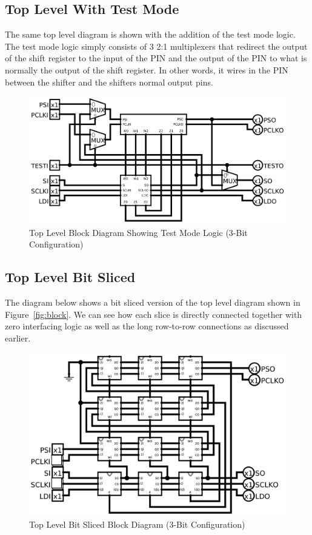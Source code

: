 \documentclass{article}
\begin{document}
    \subsection{Top Level With Test Mode }
    The same top level diagram is shown with the addition of the test
    mode logic. The test mode logic simply consists of 3 2:1 multiplexers that
    redirect the output of the shift register to the input of the PIN and the
    output of the PIN to what is normally the output of the shift register. In
    other words, it wires in the PIN between the shifter and the shifters
    normal output pins.
    \begin{figure}[H]
        \centering
        \includegraphics[width=0.9\linewidth]{../../logisim/test_mode.png}
        \caption{Top Level Block Diagram Showing Test Mode Logic (3-Bit Configuration)}
    \end{figure}

    \subsection{Top Level Bit Sliced}
    The diagram below shows a bit sliced version of the top level diagram shown
    in Figure~\ref{fig:block}. We can see how each slice is directly connected
    together with zero interfacing logic as well as the long row-to-row
    connections as discussed earlier.
    \vspace{2\baselineskip}
    \begin{figure}[H]
        \centering
        \includegraphics[width=\linewidth]{../../logisim/top_internal.png}
        \caption{Top Level Bit Sliced Block Diagram (3-Bit Configuration)}
    \end{figure}
\end{document}
